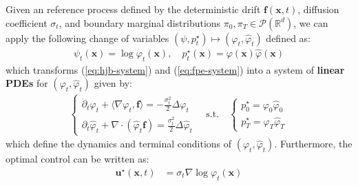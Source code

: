 \documentclass{article}
\begin{document}
\begin{theorem}\label{thm:hopf-cole-nonlinear}
    Given an reference process defined by the deterministic drift $\boldsymbol{f}(\boldsymbol{x},t)$, diffusion coefficient $\sigma_t$, and boundary marginal distributions $\pi_0, \pi_T\in \mathcal{P}(\mathbb{R}^d)$, we can apply the following change of variables $(\psi, p_t^\star) \mapsto(\varphi_t, \hat{\varphi}_t)$ defined as:
    \begin{align}
        \psi_t(\boldsymbol{x})=\log \varphi_t(\boldsymbol{x}), \quad p^\star_t(\boldsymbol{x})=\varphi(\boldsymbol{x})\hat\varphi(\boldsymbol{x})\tag{Hopf-Cole Transform}\label{eq:hopf-cole-change-var}
    \end{align}
    which transforms (\ref{eq:hjb-system}) and (\ref{eq:fpe-system}) into a system of \textbf{linear PDEs} for $(\varphi_t, \hat{\varphi}_t)$ given by:
    \begin{align}
        \begin{cases}
            \partial_t\varphi_t+\langle \nabla\varphi_t, \boldsymbol{f}\rangle=-\frac{\sigma_t^2}{2}\Delta \varphi_t\\
            \partial_t\hat{\varphi}_t+\nabla\cdot (\hat{\varphi}_t \boldsymbol{f})=\frac{\sigma_t^2}{2}\Delta \hat{\varphi}_t
        \end{cases}\quad\text{s.t.}\quad
        \begin{cases}
            p^\star_0=\varphi_0\hat{\varphi}_0\\
            p^\star_T=\varphi_T\hat{\varphi}_T
        \end{cases}\tag{Hopf-Cole PDEs}\label{eq:hopf-cole-system}
    \end{align}
    which define the dynamics and terminal conditions of $(\varphi_t,\hat\varphi_t)$. Furthermore, the optimal control can be written as:
    \begin{align}
        \boldsymbol{u}^\star(\boldsymbol{x},t)&=\sigma_t\nabla\log\varphi_t(\boldsymbol{x})\tag{Optimal Control with SB Potential}\label{eq:optimal-control-sb-potential}
    \end{align}
\end{theorem}
\end{document}
